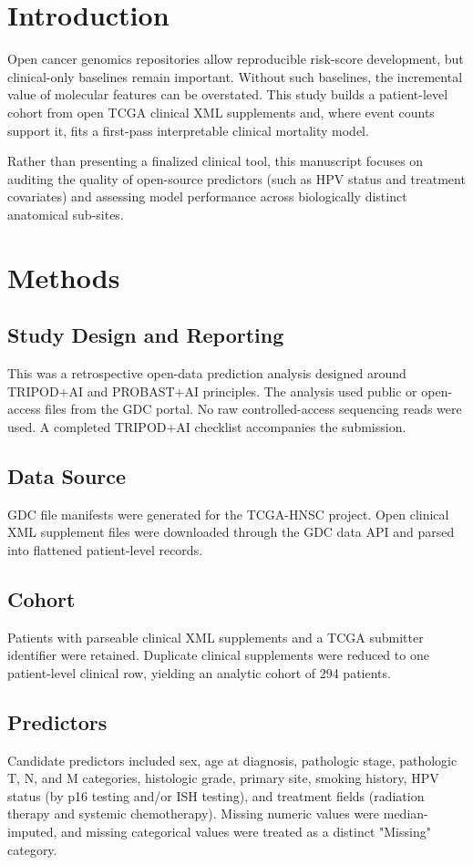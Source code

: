 \documentclass[11pt]{article}
\begin{document}
\section{Introduction}
Open cancer genomics repositories allow reproducible risk-score development, but clinical-only baselines remain important. Without such baselines, the incremental value of molecular features can be overstated. This study builds a patient-level cohort from open TCGA clinical XML supplements and, where event counts support it, fits a first-pass interpretable clinical mortality model. 

Rather than presenting a finalized clinical tool, this manuscript focuses on auditing the quality of open-source predictors (such as HPV status and treatment covariates) and assessing model performance across biologically distinct anatomical sub-sites.

\section{Methods}
\subsection{Study Design and Reporting}
This was a retrospective open-data prediction analysis designed around TRIPOD+AI and PROBAST+AI principles. The analysis used public or open-access files from the GDC portal. No raw controlled-access sequencing reads were used. A completed TRIPOD+AI checklist accompanies the submission.

\subsection{Data Source}
GDC file manifests were generated for the TCGA-HNSC project. Open clinical XML supplement files were downloaded through the GDC data API and parsed into flattened patient-level records.

\subsection{Cohort}
Patients with parseable clinical XML supplements and a TCGA submitter identifier were retained. Duplicate clinical supplements were reduced to one patient-level clinical row, yielding an analytic cohort of 294 patients.

\subsection{Predictors}
Candidate predictors included sex, age at diagnosis, pathologic stage, pathologic T, N, and M categories, histologic grade, primary site, smoking history, HPV status (by p16 testing and/or ISH testing), and treatment fields (radiation therapy and systemic chemotherapy). Missing numeric values were median-imputed, and missing categorical values were treated as a distinct "Missing" category.
\end{document}

